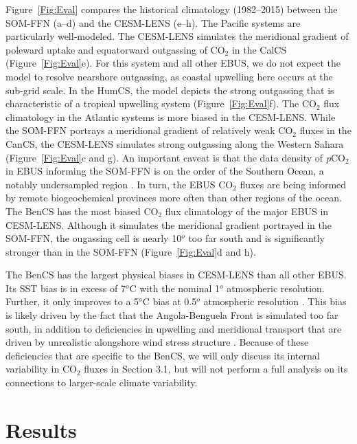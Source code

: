 \documentclass[hvmath, online,bgd]{copernicus_discussions}
\begin{document}
Figure~\ref{Fig:Eval} compares the historical climatology (1982--2015) between the SOM-FFN (a--d) and the CESM-LENS (e--h). The Pacific systems are particularly well-modeled. The CESM-LENS simulates the meridional gradient of poleward uptake and equatorward outgassing of CO$_{2}$ in the CalCS (Figure~\ref{Fig:Eval}e). For this system and all other EBUS, we do not expect the model to resolve nearshore outgassing, as coastal upwelling here occurs at the sub-grid scale. In the HumCS, the model depicts the strong outgassing that is characteristic of a tropical upwelling system (Figure~\ref{Fig:Eval}f). The CO$_{2}$ flux climatology in the Atlantic systems is more biased in the CESM-LENS. While the SOM-FFN portrays a meridional gradient of relatively weak CO$_{2}$ fluxes in the CanCS, the CESM-LENS simulates strong outgassing along the Western Sahara (Figure~\ref{Fig:Eval}c and g). An important caveat is that the data density of \textit{p}CO$_{2}$ in EBUS informing the SOM-FFN is on the order of the Southern Ocean, a notably undersampled region \citep{Bakker:2016,Laruelle:2017}. In turn, the EBUS CO$_{2}$ fluxes are being informed by remote biogeochemical provinces more often than other regions of the ocean. The BenCS has the most biased CO$_{2}$ flux climatology of the major EBUS in CESM-LENS. Although it simulates the meridional gradient portrayed in the SOM-FFN, the ougassing cell is nearly 10$^{o}$ too far south and is significantly stronger than in the SOM-FFN (Figure~\ref{Fig:Eval}d and h).

The BenCS has the largest physical biases in CESM-LENS than all other EBUS. Its SST bias is in excess of 7$^{o}$C with the nominal 1$^{o}$ atmospheric resolution. Further, it only improves to a 5$^{o}$C bias at 0.5$^{o}$ atmospheric resolution \citep{Gent:2010}. This bias is likely driven by the fact that the Angola-Benguela Front is simulated too far south, in addition to deficiencies in upwelling and meridional transport that are driven by unrealistic alongshore wind stress structure \citep{Small:2015}. Because of these deficiencies that are specific to the BenCS, we will only discuss its internal variability in CO$_{2}$ fluxes in Section 3.1, but will not perform a full analysis on its connections to larger-scale climate variability.

\section{Results}
\end{document}
